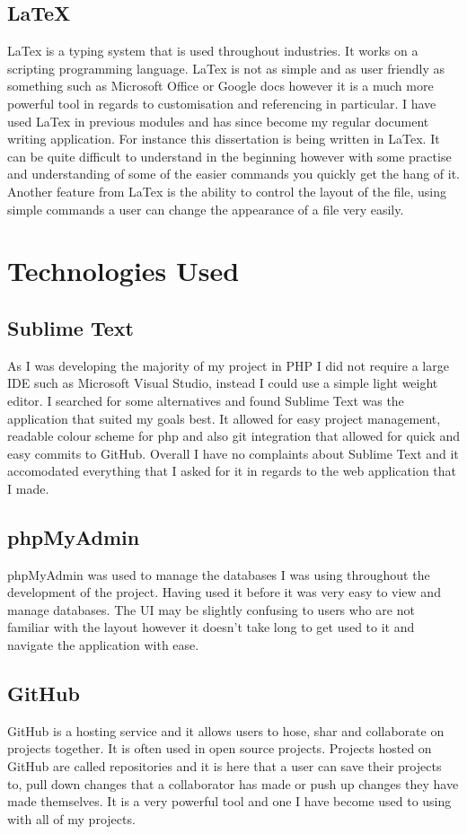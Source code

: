 \subsection{LaTeX}
LaTex is a typing system that is used throughout industries. It works on a scripting programming language. LaTex is not as simple and as user friendly as something such as Microsoft Office or Google docs however it is a much more powerful tool in regards to customisation and referencing in particular. I have used LaTex in previous modules and has since become my regular document writing application. For instance this dissertation is being written in LaTex. It can be quite difficult to understand in the beginning however with some practise and understanding of some of the easier commands you quickly get the hang of it. Another feature from LaTex is the ability to control the layout of the file, using simple commands a user can change the appearance of a file very easily.

\section{Technologies Used}
\subsection{Sublime Text}
As I was developing the majority of my project in PHP I did not require a large IDE such as Microsoft Visual Studio, instead I could use a simple light weight editor. I searched for some alternatives and found Sublime Text was the application that suited my goals best. It allowed for easy project management, readable colour scheme for php and also git integration that allowed for quick and easy commits to GitHub. Overall I have no complaints about Sublime Text and it accomodated everything that I asked for it in regards to the web application that I made. 

\subsection{phpMyAdmin}
phpMyAdmin was used to manage the databases I was using throughout the development of the project. Having used it before it was very easy to view and manage databases. The UI may be slightly confusing to users who are not familiar with the layout however it doesn't take long to get used to it and navigate the application with ease.

\subsection{GitHub}
GitHub is a hosting service and it allows users to hose, shar and collaborate on projects together. It is often used in open source projects. Projects hosted on GitHub are called repositories and it is here that a user can save their projects to, pull down changes that a collaborator has made or push up changes they have made themselves. It is a very powerful tool and one I have become used to using with all of my projects.

